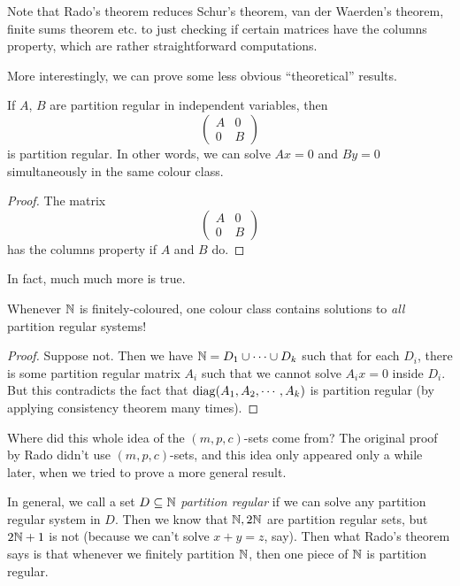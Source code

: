 \documentclass[a4paper]{article}
\begin{document}
  Note that Rado's theorem reduces Schur's theorem, van der Waerden's theorem, finite sums theorem etc. to just checking if certain matrices have the columns property, which are rather straightforward computations.

  More interestingly, we can prove some less obvious ``theoretical'' results.

  \begin{cor}
    If $A$, $B$ are partition regular in independent variables, then
    \[
      \begin{pmatrix}
        A & 0\\
        0 & B
      \end{pmatrix}
    \]
    is partition regular. In other words, we can solve $Ax = 0$ and $By = 0$ simultaneously in the same colour class.
  \end{cor}

  \begin{proof}
    The matrix
    \[
      \begin{pmatrix}
        A & 0\\
        0 & B
      \end{pmatrix}
    \]
    has the columns property if $A$ and $B$ do.
  \end{proof}
  In fact, much much more is true.

  \begin{cor}
    Whenever $\mathbb{N}$ is finitely-coloured, one colour class contains solutions to \emph{all} partition regular systems!
  \end{cor}

  \begin{proof}
    Suppose not. Then we have $\mathbb{N} = D_1 \cup \cdots \cup D_k$ such that for each $D_i$, there is some partition regular matrix $A_i$ such that we cannot solve $A_i x = 0$ inside $D_i$. But this contradicts the fact that $\operatorname{diag}(A_1, A_2, \cdots, A_k)$ is partition regular (by applying consistency theorem many times).
  \end{proof}

  Where did this whole idea of the $(m, p, c)$-sets come from? The original proof by Rado didn't use $(m, p, c)$-sets, and this idea only appeared only a while later, when we tried to prove a more general result.

  In general, we call a set $D \subseteq \mathbb{N}$ \emph{partition regular} if we can solve any partition regular system in $D$. Then we know that $\mathbb{N}, 2\mathbb{N}$ are partition regular sets, but $2\mathbb{N} + 1$ is not (because we can't solve $x + y = z$, say). Then what Rado's theorem says is that whenever we finitely partition $\mathbb{N}$, then one piece of $\mathbb{N}$ is partition regular.
\end{document}
